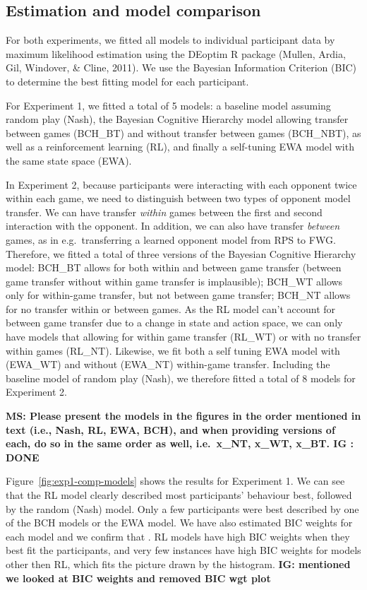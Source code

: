 \documentclass[man,floatsintext]{apa6}
\begin{document}
\hypertarget{estimation-and-model-comparison}{%
\subsection{Estimation and model comparison}\label{estimation-and-model-comparison}}

For both experiments, we fitted all models to individual participant data by maximum likelihood estimation using the DEoptim R package (Mullen, Ardia, Gil, Windover, \& Cline, 2011). We use the Bayesian Information Criterion (BIC) to determine the best fitting model for each participant.

For Experiment 1, we fitted a total of 5 models: a baseline model assuming random play (Nash), the Bayesian Cognitive Hierarchy model allowing transfer between games (BCH\_BT) and without transfer between games (BCH\_NBT), as well as a reinforcement learning (RL), and finally a self-tuning EWA model with the same state space (EWA).

In Experiment 2, because participants were interacting with each opponent twice within each game, we need to distinguish between two types of opponent model transfer. We can have transfer \emph{within} games between the first and second interaction with the opponent. In addition, we can also have transfer \emph{between} games, as in e.g.~transferring a learned opponent model from RPS to FWG. Therefore, we fitted a total of three versions of the Bayesian Cognitive Hierarchy model: BCH\_BT allows for both within and between game transfer (between game transfer without within game transfer is implausible); BCH\_WT allows only for within-game transfer, but not between game transfer; BCH\_NT allows for no transfer within or between games. As the RL model can't account for between game transfer due to a change in state and action space, we can only have models that allowing for within game transfer (RL\_WT) or with no transfer within games (RL\_NT). Likewise, we fit both a self tuning EWA model with (EWA\_WT) and without (EWA\_NT) within-game transfer. Including the baseline model of random play (Nash), we therefore fitted a total of 8 models for Experiment 2.

\textbf{MS: Please present the models in the figures in the order mentioned in text (i.e., Nash, RL, EWA, BCH), and when providing versions of each, do so in the same order as well, i.e.~x\_NT, x\_WT, x\_BT. IG : DONE }

Figure~\ref{fig:exp1-comp-models} shows the results for Experiment 1. We can see that the RL model clearly described most participants' behaviour best, followed by the random (Nash) model. Only a few participants were best described by one of the BCH models or the EWA model. We have also estimated BIC weights for each model and we confirm that . RL models have high BIC weights when they best fit the participants, and very few instances have high BIC weights for models other then RL, which fits the picture drawn by the histogram. \textbf{IG: mentioned we looked at BIC weights and removed BIC wgt plot }
\end{document}
